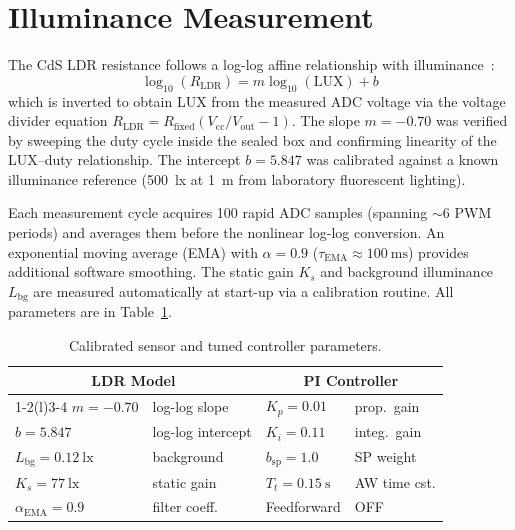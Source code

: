 \documentclass[10pt,twocolumn]{article}
\begin{document}
\section{Illuminance Measurement}

The CdS LDR resistance follows a log-log affine relationship with illuminance~\cite{projectguide}:
\begin{equation}
  \log_{10}(R_\mathrm{LDR}) = m \log_{10}(\mathrm{LUX}) + b
  \label{eq:ldr}
\end{equation}
which is inverted to obtain LUX from the measured ADC voltage via the voltage divider equation $R_\mathrm{LDR} = R_\mathrm{fixed}(V_\mathrm{cc}/V_\mathrm{out} - 1)$. The slope $m = -0.70$ was verified by sweeping the duty cycle inside the sealed box and confirming linearity of the LUX--duty relationship. The intercept $b = 5.847$ was calibrated against a known illuminance reference (\SI{500}{\lux} at \SI{1}{\metre} from laboratory fluorescent lighting).

Each measurement cycle acquires 100 rapid ADC samples (spanning $\sim$6 PWM periods) and averages them before the nonlinear log-log conversion. An exponential moving average (EMA) with $\alpha = 0.9$ ($\tau_\mathrm{EMA} \approx \SI{100}{\milli\second}$) provides additional software smoothing. The static gain $K_s$ and background illuminance $L_\mathrm{bg}$ are measured automatically at start-up via a calibration routine. All parameters are in Table~\ref{tab:params}.

\begin{table}[H]
\centering
\caption{Calibrated sensor and tuned controller parameters.}
\label{tab:params}
\small
\setlength{\tabcolsep}{4pt}
\begin{tabular}{@{}llll@{}}
  \toprule
  \multicolumn{2}{c}{\textbf{LDR Model}} & \multicolumn{2}{c}{\textbf{PI Controller}} \\
  \cmidrule(r){1-2}\cmidrule(l){3-4}
  $m = -0.70$        & log-log slope     & $K_p = 0.01$        & prop.\ gain \\
  $b = 5.847$        & log-log intercept & $K_i = 0.11$        & integ.\ gain \\
  $L_\mathrm{bg}=\SI{0.12}{\lux}$ & background & $b_\mathrm{sp}=1.0$ & SP weight \\
  $K_s=\SI{77}{\lux}$  & static gain    & $T_t=\SI{0.15}{\second}$ & AW time cst. \\
  $\alpha_\mathrm{EMA}=0.9$ & filter coeff. & Feedforward     & OFF \\
  \bottomrule
\end{tabular}
\end{table}
\end{document}
